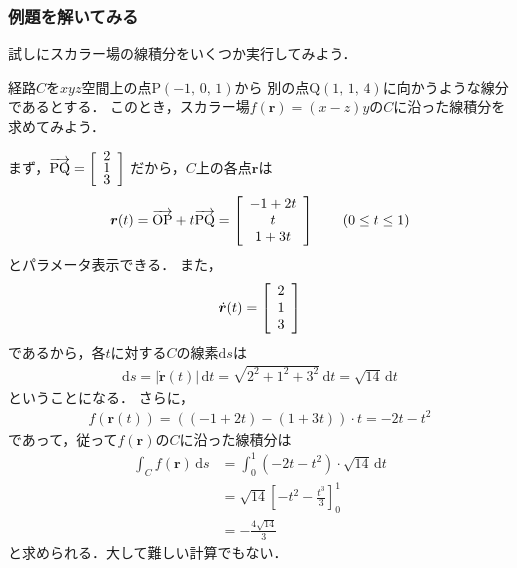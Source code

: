 \subsubsection{例題を解いてみる}
試しにスカラー場の線積分をいくつか実行してみよう．

経路$C$を$xyz$空間上の点$\mathrm{P} ( -1, \, 0, \, 1)$から
別の点$\mathrm{Q} (1, \, 1, \, 4)$に向かうような線分であるとする．
このとき，スカラー場$f( \bm{r} ) = (x-z)y $の$C$に沿った線積分を求めてみよう．

まず，$\overrightarrow{ \mathrm{PQ} } = 
\left[ 
\renewcommand{\arraystretch}{0.6}
\begin{array}{c}
2 \\
1 \\
3 
\end{array}
\right]$
だから，$C$上の各点$\bm{r}$は
\begin{align*}
\bm{r} (t) = \overrightarrow{ \mathrm{OP} } 
+ t \overrightarrow{ \mathrm{PQ} }
= 
\left[
\renewcommand{\arraystretch}{1}
\begin{array}{c}
-1 + 2t \\
t \\
1+ 3t 
\end{array}
\right]
\qquad (0 \leq t \leq 1) 
\end{align*}
とパラメータ表示できる．
また，
\begin{align*}
\dot{ \bm{r} } (t)  = \left[
\renewcommand{\arraystretch}{1}
\begin{array}{c}
2 \\
1 \\
3
\end{array}
\right]
\end{align*}
であるから，各$t$に対する$C$の線素$\mathrm{d}s$は
\begin{align*}
\mathrm{d} s = \lvert \dot{ \bm{r} } (t)  \rvert \, \mathrm{d}t
= \sqrt{ 2^2 + 1^2 + 3^2 } \, \mathrm{d}t
= \sqrt{14} \, \mathrm{d}t
\end{align*}
ということになる．
さらに，
\begin{align*}
f( \bm{r} (t) ) = ( (-1+2t ) - (1+ 3t ) ) \cdot t 
= -2t - t^2
\end{align*}
であって，従って$f(\bm{r})$の$C$に沿った線積分は
\begin{align*}
\int_C f( \bm{r} ) \, \mathrm{d} s & = 
\int_0^1 (-2t - t^2 ) \cdot \sqrt {14} \, \mathrm{d}t \\
& = \sqrt{14} \left[ -t^2 -\frac{t^3}{3} \right]_0^1 \\
& = - \frac{ 4 \sqrt{14} }{3}
\end{align*}
と求められる．大して難しい計算でもない．


